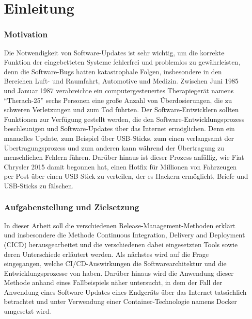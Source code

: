 \chapter{Einleitung}

\subsection{Motivation}

Die Notwendigkeit von Software-Updates ist sehr wichtig, um die korrekte Funktion
der eingebetteten Systeme fehlerfrei und problemlos zu gewährleisten, denn die Software-Bugs hatten katastrophale Folgen, insbesondere in den Bereichen Luft- und Raumfahrt, Automotive und Medizin. Zwischen Juni 1985 und Januar 1987 verabreichte ein computergesteuertes Therapiegerät namens “Therach-25” sechs Personen eine große Anzahl von Überdosierungen, die zu schweren Verletzungen und zum Tod führten.
Der Software-Entwicklern sollten Funktionen zur Verfügung gestellt werden, die den Software-Entwicklungsprozess beschleunigen und Software-Updates über das Internet ermöglichen. Denn ein manuelles Update, zum Beispiel über USB-Sticks, zum einen verlangsamt der Übertragungsprozess und zum anderen kann während der Übertragung zu menschlichen Fehlern führen. Darüber hinaus ist dieser Prozess anfällig, wie Fiat Chrysler 2015 damit begonnen hat, einen Hotfix für Millionen von Fahrzeugen per Post über einen USB-Stick zu verteilen, der es Hackern ermöglicht, Briefe und USB-Sticks zu fälschen.


\subsection{Aufgabenstellung und Zielsetzung}

In dieser Arbeit soll die verschiedenen Release-Management-Methoden erklärt und insbesondere die Methode Continuous Integration, Delivery and Deployment (CICD) herausgearbeitet und die verschiedenen dabei eingesetzten Tools sowie deren Unterschiede erläutert werden. Als nächstes wird auf die Frage eingegangen, welche CI/CD-Auswirkungen die Softwarearchitektur und die Entwicklungsprozesse von haben. Darüber hinaus wird die Anwendung dieser Methode anhand eines Fallbeispiels näher untersucht, in dem der Fall der Anwendung eines Software-Updates eines Endgeräts über das Internet tatsächlich betrachtet und unter Verwendung einer Container-Technologie namens Docker umgesetzt wird.
